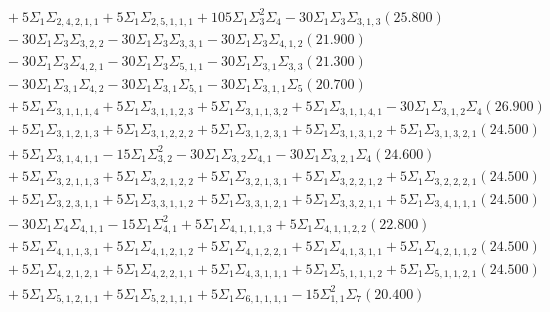 \documentclass[12pt]{article}
\begin{document}
\begin{landscape}
\begin{align*}
		&\quad\quad +5\Sigma_{1}\Sigma_{2,4,2,1,1}+5\Sigma_{1}\Sigma_{2,5,1,1,1}+105\Sigma_{1}\Sigma_{3}^{2}\Sigma_{4}-30\Sigma_{1}\Sigma_{3}\Sigma_{3,1,3}(25.800) \\ 
		&\quad\quad -30\Sigma_{1}\Sigma_{3}\Sigma_{3,2,2}-30\Sigma_{1}\Sigma_{3}\Sigma_{3,3,1}-30\Sigma_{1}\Sigma_{3}\Sigma_{4,1,2}(21.900) \\ 
		&\quad\quad -30\Sigma_{1}\Sigma_{3}\Sigma_{4,2,1}-30\Sigma_{1}\Sigma_{3}\Sigma_{5,1,1}-30\Sigma_{1}\Sigma_{3,1}\Sigma_{3,3}(21.300) \\ 
		&\quad\quad -30\Sigma_{1}\Sigma_{3,1}\Sigma_{4,2}-30\Sigma_{1}\Sigma_{3,1}\Sigma_{5,1}-30\Sigma_{1}\Sigma_{3,1,1}\Sigma_{5}(20.700) \\ 
		&\quad\quad +5\Sigma_{1}\Sigma_{3,1,1,1,4}+5\Sigma_{1}\Sigma_{3,1,1,2,3}+5\Sigma_{1}\Sigma_{3,1,1,3,2}+5\Sigma_{1}\Sigma_{3,1,1,4,1}-30\Sigma_{1}\Sigma_{3,1,2}\Sigma_{4}(26.900) \\ 
		&\quad\quad +5\Sigma_{1}\Sigma_{3,1,2,1,3}+5\Sigma_{1}\Sigma_{3,1,2,2,2}+5\Sigma_{1}\Sigma_{3,1,2,3,1}+5\Sigma_{1}\Sigma_{3,1,3,1,2}+5\Sigma_{1}\Sigma_{3,1,3,2,1}(24.500) \\ 
		&\quad\quad +5\Sigma_{1}\Sigma_{3,1,4,1,1}-15\Sigma_{1}\Sigma_{3,2}^{2}-30\Sigma_{1}\Sigma_{3,2}\Sigma_{4,1}-30\Sigma_{1}\Sigma_{3,2,1}\Sigma_{4}(24.600) \\ 
		&\quad\quad +5\Sigma_{1}\Sigma_{3,2,1,1,3}+5\Sigma_{1}\Sigma_{3,2,1,2,2}+5\Sigma_{1}\Sigma_{3,2,1,3,1}+5\Sigma_{1}\Sigma_{3,2,2,1,2}+5\Sigma_{1}\Sigma_{3,2,2,2,1}(24.500) \\ 
		&\quad\quad +5\Sigma_{1}\Sigma_{3,2,3,1,1}+5\Sigma_{1}\Sigma_{3,3,1,1,2}+5\Sigma_{1}\Sigma_{3,3,1,2,1}+5\Sigma_{1}\Sigma_{3,3,2,1,1}+5\Sigma_{1}\Sigma_{3,4,1,1,1}(24.500) \\ 
		&\quad\quad -30\Sigma_{1}\Sigma_{4}\Sigma_{4,1,1}-15\Sigma_{1}\Sigma_{4,1}^{2}+5\Sigma_{1}\Sigma_{4,1,1,1,3}+5\Sigma_{1}\Sigma_{4,1,1,2,2}(22.800) \\ 
		&\quad\quad +5\Sigma_{1}\Sigma_{4,1,1,3,1}+5\Sigma_{1}\Sigma_{4,1,2,1,2}+5\Sigma_{1}\Sigma_{4,1,2,2,1}+5\Sigma_{1}\Sigma_{4,1,3,1,1}+5\Sigma_{1}\Sigma_{4,2,1,1,2}(24.500) \\ 
		&\quad\quad +5\Sigma_{1}\Sigma_{4,2,1,2,1}+5\Sigma_{1}\Sigma_{4,2,2,1,1}+5\Sigma_{1}\Sigma_{4,3,1,1,1}+5\Sigma_{1}\Sigma_{5,1,1,1,2}+5\Sigma_{1}\Sigma_{5,1,1,2,1}(24.500) \\ 
		&\quad\quad +5\Sigma_{1}\Sigma_{5,1,2,1,1}+5\Sigma_{1}\Sigma_{5,2,1,1,1}+5\Sigma_{1}\Sigma_{6,1,1,1,1}-15\Sigma_{1,1}^{2}\Sigma_{7}(20.400) \\ 

\end{align*}
\end{landscape}
\end{document}

